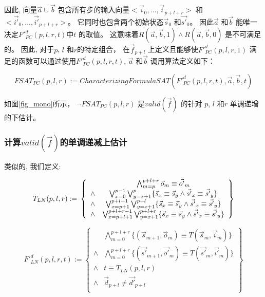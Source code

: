 因此,
向量$\vec{a}\cup\vec{b}$ 包含所有步的输入向量$<\vec{i}_0,\dots,\vec{i}_{p+l+r}>$ 和$<\vec{i'}_0,\dots,\vec{i'}_{p+l+r}>$。
它同时也包含两个初始状态$\vec{s}_0$ 和$\vec{s'}_0$。
因此$\vec{a}$ 和$\vec{b}$ 能唯一决定$F'^d_{PC}(p,l,r,t)$中$t$ 的取值。
这意味着$R(\vec{a},\vec{b},1)\wedge R(\vec{a},\vec{b},0)$ 是不可满足的。
因此,
对于$p$, $l$ 和$r$的特定组合，
在$\vec{f}_{p+l}$ 上定义且能够使$F'^d_{PC}(p,l,r,1)$ 满足的函数可以通过使用$F'^d_{PC}(p,l,r,t)$, $\vec{a}$ 和$\vec{b}$ 调用算法定义如下：

\begin{equation}\label{fsat_pc}
FSAT_{PC}(p,l,r):=CharacterizingFormulaSAT(F'^d_{PC}(p,l,r,t),\vec{a},\vec{b},t)
\end{equation}

如图\ref{fig_mono}所示，
$\neg FSAT_{PC}(p,l,r)$ 是$valid(\vec{f})$ 的针对
$p$, $l$ 和$r$
单调递增的下估计。




\subsubsection{计算$valid(\vec{f})$的单调递减上估计}\label{subsub_loop}
类似的,
我们定义:

\begin{equation}\label{tln}
T_{LN}(p,l,r):=\\
\left\{
\begin{array}{cc}
      &\bigwedge_{m=p}^{p+l+r}\vec{o}_m\equiv \vec{o'}_m \\
\wedge&\bigvee_{x=0}^{p-1}\bigvee_{y=x+1}^{p} \{\vec{s}_x\equiv \vec{s}_y\wedge \vec{s'}_x\equiv \vec{s'}_y\} \\
\wedge&\bigvee_{x=p+1}^{p+l-1}\bigvee_{y=x+1}^{p+l} \{\vec{s}_x\equiv \vec{s}_y\wedge \vec{s'}_x\equiv \vec{s'}_y\} \\
\wedge&\bigvee_{x=p+l+1}^{p+l+r-1}\bigvee_{y=x+1}^{p+l+r} \{\vec{s}_x\equiv \vec{s}_y\wedge \vec{s'}_x\equiv \vec{s'}_y\}
\end{array}
\right\}
\end{equation}



\begin{equation}\label{lndef1}
F'^d_{LN}(p,l,r,t):=
\left\{
\begin{array}{cc}
&\bigwedge_{m=0}^{p+l+r}
\{
(\vec{s}_{m+1},\vec{o}_m)\equiv T(\vec{s}_m,\vec{i}_m)
\}
\\
\wedge&\bigwedge_{m=0}^{p+l+r}
\{
(\vec{s'}_{m+1},\vec{o'}_m)\equiv T(\vec{s'}_m,\vec{i'}_m)
\}
\\
\wedge& t\equiv T_{LN}(p,l,r)\\
\wedge& \vec{d}_{p+l}\ne \vec{d'}_{p+l} \\
\end{array}
\right\}
\end{equation}


